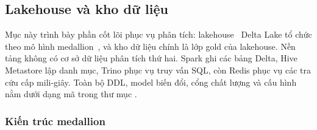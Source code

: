 \subsection{Lakehouse và kho dữ liệu}
\label{chap:lakehouse}

Mục này trình bày phần cốt lõi phục vụ phân tích: lakehouse~\cite{armbrust2021lakehouse} Delta Lake tổ chức theo mô hình medallion~\cite{databricksMedallion}, và kho dữ liệu chính là lớp gold của lakehouse. Nền tảng không có cơ sở dữ liệu phân tích thứ hai. Spark ghi các bảng Delta, Hive Metastore lập danh mục, Trino phục vụ truy vấn SQL, còn Redis phục vụ các tra cứu cấp mili-giây. Toàn bộ DDL, model biến đổi, cổng chất lượng và cấu hình nằm dưới dạng mã trong thư mục .

\subsubsection{Kiến trúc medallion}

